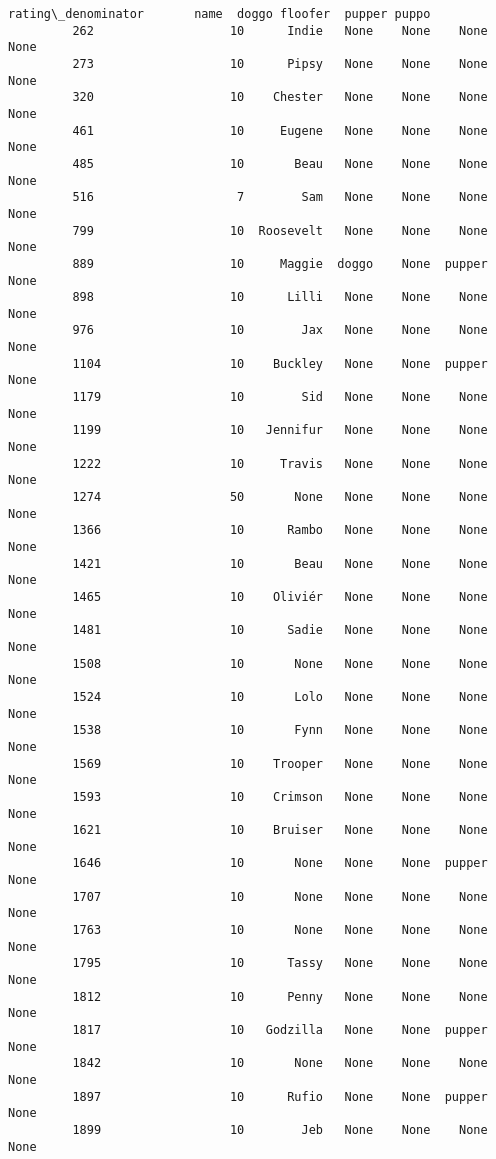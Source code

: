 \documentclass[11pt]{article}
\begin{document}
\begin{Verbatim}[commandchars=\\\{\}]
               rating\_denominator       name  doggo floofer  pupper puppo  
         262                   10      Indie   None    None    None  None  
         273                   10      Pipsy   None    None    None  None  
         320                   10    Chester   None    None    None  None  
         461                   10     Eugene   None    None    None  None  
         485                   10       Beau   None    None    None  None  
         516                    7        Sam   None    None    None  None  
         799                   10  Roosevelt   None    None    None  None  
         889                   10     Maggie  doggo    None  pupper  None  
         898                   10      Lilli   None    None    None  None  
         976                   10        Jax   None    None    None  None  
         1104                  10    Buckley   None    None  pupper  None  
         1179                  10        Sid   None    None    None  None  
         1199                  10   Jennifur   None    None    None  None  
         1222                  10     Travis   None    None    None  None  
         1274                  50       None   None    None    None  None  
         1366                  10      Rambo   None    None    None  None  
         1421                  10       Beau   None    None    None  None  
         1465                  10    Oliviér   None    None    None  None  
         1481                  10      Sadie   None    None    None  None  
         1508                  10       None   None    None    None  None  
         1524                  10       Lolo   None    None    None  None  
         1538                  10       Fynn   None    None    None  None  
         1569                  10    Trooper   None    None    None  None  
         1593                  10    Crimson   None    None    None  None  
         1621                  10    Bruiser   None    None    None  None  
         1646                  10       None   None    None  pupper  None  
         1707                  10       None   None    None    None  None  
         1763                  10       None   None    None    None  None  
         1795                  10      Tassy   None    None    None  None  
         1812                  10      Penny   None    None    None  None  
         1817                  10   Godzilla   None    None  pupper  None  
         1842                  10       None   None    None    None  None  
         1897                  10      Rufio   None    None  pupper  None  
         1899                  10        Jeb   None    None    None  None  

\end{Verbatim}
\end{document}
